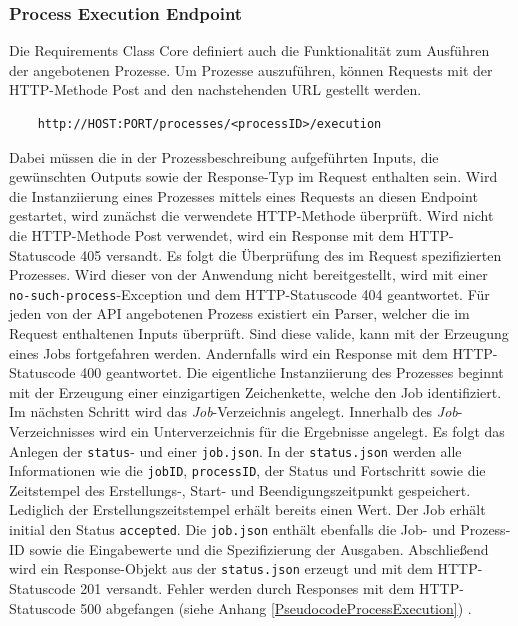 \subsubsection{Process Execution Endpoint}
Die Requirements Class Core definiert auch die Funktionalität zum Ausführen der angebotenen Prozesse.
Um Prozesse auszuführen, können Requests mit der HTTP-Methode Post and den nachstehenden URL gestellt werden.
\begin{center}
\begin{BVerbatim}
    http://HOST:PORT/processes/<processID>/execution
\end{BVerbatim}
\end{center}
Dabei müssen die in der Prozessbeschreibung aufgeführten Inputs, die gewünschten Outputs sowie der Response-Typ im Request enthalten sein. 
Wird die Instanziierung eines Prozesses mittels eines Requests an diesen Endpoint gestartet, wird zunächst die verwendete HTTP-Methode überprüft. 
Wird nicht die HTTP-Methode Post verwendet, wird ein Response mit dem HTTP-Statuscode 405 versandt. Es folgt die Überprüfung des im Request spezifizierten 
Prozesses. Wird dieser von der Anwendung nicht bereitgestellt, wird mit einer \verb|no-such-process|-Exception und dem HTTP-Statuscode 404 geantwortet.
Für jeden von der API angebotenen Prozess existiert ein Parser, welcher die im Request enthaltenen Inputs überprüft. Sind diese valide, kann mit der Erzeugung eines 
Jobs fortgefahren werden. Andernfalls wird ein Response mit dem HTTP-Statuscode 400 geantwortet. 
Die eigentliche Instanziierung des Prozesses beginnt mit der Erzeugung einer einzigartigen Zeichenkette, welche den Job identifiziert. 
Im nächsten Schritt wird das \emph{Job}-Verzeichnis angelegt. Innerhalb des \emph{Job}-Verzeichnisses wird ein 
Unterverzeichnis für die Ergebnisse angelegt. Es folgt das Anlegen der \verb|status|- und einer \verb|job.json|. In der \verb|status.json| werden alle Informationen 
wie die \verb|jobID|, \verb|processID|, der Status und Fortschritt sowie die Zeitstempel des Erstellungs-, Start- und Beendigungszeitpunkt gespeichert. 
Lediglich der Erstellungszeitstempel erhält bereits einen Wert. Der Job erhält initial den Status \verb|accepted|.
Die \verb|job.json| enthält ebenfalls die Job- und Prozess-ID sowie die Eingabewerte und die Spezifizierung der Ausgaben. 
Abschließend wird ein Response-Objekt aus der \verb|status.json| erzeugt und mit dem HTTP-Statuscode 201 versandt.  
Fehler werden durch Responses mit dem HTTP-Statuscode 500 
abgefangen (siehe Anhang \ref{PseudocodeProcessExecution}) \cite{code,ogc_api_processes_core}.

